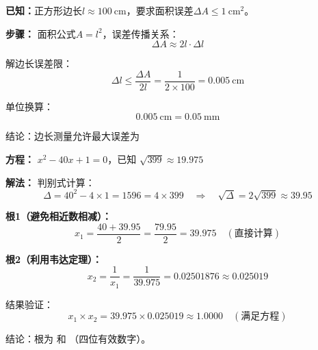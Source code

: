 \documentclass[UTF8]{ctexart}
\begin{document}
\begin{tcolorbox}[colback=blue!5!white,colframe=blue!75!black,title=5 边长误差限计算]
	\textbf{已知：}正方形边长$l \approx100\ \mathrm{cm}$，要求面积误差$\Delta A \leq1\ \mathrm{cm}^2$。
	
	\textbf{步骤：}
	面积公式$A=l^2$，误差传播关系：
	\begin{equation}
	\Delta A \approx 2l \cdot \Delta l
	\end{equation}
	
	解边长误差限：
	\begin{equation}
	\Delta l \leq \frac{\Delta A}{2l} = \frac{1}{2\times100} = 0.005\ \mathrm{cm}
	\end{equation}
	
	单位换算：
	\begin{equation}
	0.005\ \mathrm{cm} = 0.05\ \mathrm{mm}
	\end{equation}
	
	结论：边长测量允许最大误差为
\end{tcolorbox}
\begin{tcolorbox}[colback=blue!5!white,colframe=blue!75!black,title=问题7 方程求根]
	\textbf{方程：} $ x^2 - 40x + 1 = 0 $，已知 $ \sqrt{399} \approx 19.975 $
	
	\textbf{解法：}
	判别式计算：
	$$
	\Delta = 40^2 - 4 \times 1 = 1596 = 4 \times 399 \quad \Rightarrow \quad \sqrt{\Delta} = 2\sqrt{399} \approx 39.95
	$$
	
	\textbf{根1（避免相近数相减）：}
	$$
	x_1 = \frac{40 + 39.95}{2} = \frac{79.95}{2} = 39.975 \quad (\text{直接计算})
	$$
	
	\textbf{根2（利用韦达定理）：}
	$$
	x_2 = \frac{1}{x_1} = \frac{1}{39.975} = 0.02501876 \approx 0.025019
	$$
	
	结果验证：
	$$
	x_1 \times x_2 = 39.975 \times 0.025019 \approx 1.0000 \quad (\text{满足方程})
	$$
	
	结论：根为  和 （四位有效数字）。
\end{tcolorbox}
\end{document}

